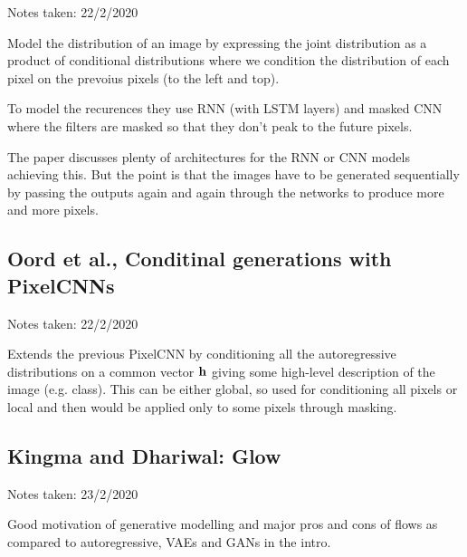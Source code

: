 \begin{notebox}

\hfill Notes taken: 22/2/2020 
\end{notebox}

Model the distribution of an image by expressing the joint distribution as a product of conditional distributions where we condition the distribution of each pixel on the prevoius pixels (to the left and top).

To model the recurences they use RNN (with LSTM layers) and masked CNN where the filters are masked so that they don't peak to the future pixels.

The paper discusses plenty of architectures for the RNN or CNN models achieving this. But the point is that the images have to be generated sequentially by passing the outputs again and again through the networks to produce more and more pixels.

\subsection{Oord et al., Conditinal generations with PixelCNNs}

\begin{notebox}

\hfill Notes taken: 22/2/2020 
\end{notebox}

Extends the previous PixelCNN by conditioning all the autoregressive distributions on a common vector $\mathbf{h}$ giving some high-level description of the image (e.g. class). This can be either global, so used for conditioning all pixels or local and then would be applied only to some pixels through masking.

\subsection{Kingma and Dhariwal: Glow}\label{sec:Glow}

\begin{notebox}

\hfill Notes taken: 23/2/2020 
\end{notebox}

Good motivation of generative modelling and major pros and cons of flows as compared to autoregressive, VAEs and GANs in the intro.

